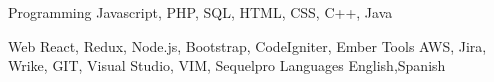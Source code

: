 \begin{cvskills}

  \cvskill
    {Programming} %
    {Javascript, PHP, SQL, HTML, CSS, C++, Java} %

  \cvskill
    {Web} %
    {React, Redux, Node.js, Bootstrap, CodeIgniter, Ember} %
\cvskill
    {Tools} %
    {AWS, Jira, Wrike, GIT, Visual Studio, VIM, Sequelpro} %
  \cvskill
    {Languages} %
    {English,Spanish} %
\end{cvskills}